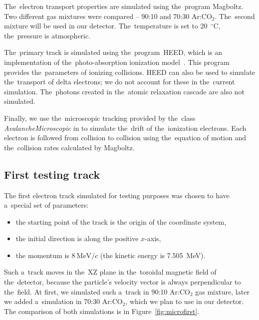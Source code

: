 		The~electron transport properties are simulated using the~program Magboltz. Two different gas mixtures were compared -- 90:10 and 70:30 Ar:CO$_2$. The~second mixture will be used in our detector. The~temperature is set to 20~$^\circ$C, the~pressure is atmospheric.
		
		The~primary track is simulated using the~program~\ac{HEED}, which is an implementation of the~photo-absorption ionization model~\cite{HEED}. This program provides the~parameters of ionizing collisions. \ac{HEED} can also be used to simulate the~transport of delta electrons; we do not account for these in the~current simulation. The~photons created in the~atomic relaxation cascade are also not simulated.
		
		Finally, we use the~microscopic tracking provided by the~class \textit{AvalancheMicroscopic} in \garfieldpp to simulate the~drift of the~ionization electrons. Each electron is followed from collision to collision using the~equation of motion and the~collision rates calculated by Magboltz.
		
		
		\subsection{First testing track}
		\label{sec:microfirst}
			The first electron track simulated for testing purposes was chosen to have a~special set of parameters:
				\begin{itemize}[nosep]
					\item the starting point of the track is the origin of the coordinate system,
					\item the initial direction is along the positive $x$-axis,
					\item the momentum is $8~\text{MeV}/c$ (the kinetic energy is 7.505~MeV).
				\end{itemize}
			Such a~track moves in the~XZ plane in the~toroidal magnetic field of the~detector, because the particle's velocity vector is always perpendicular to the~field. At first, we simulated such a~track in 90:10 Ar:CO$_2$ gas mixture, later we added a~simulation in 70:30 Ar:CO$_2$, which we plan to use in our detector. The comparison of both simulations is in Figure~\ref{fig:microfirst}.
			
